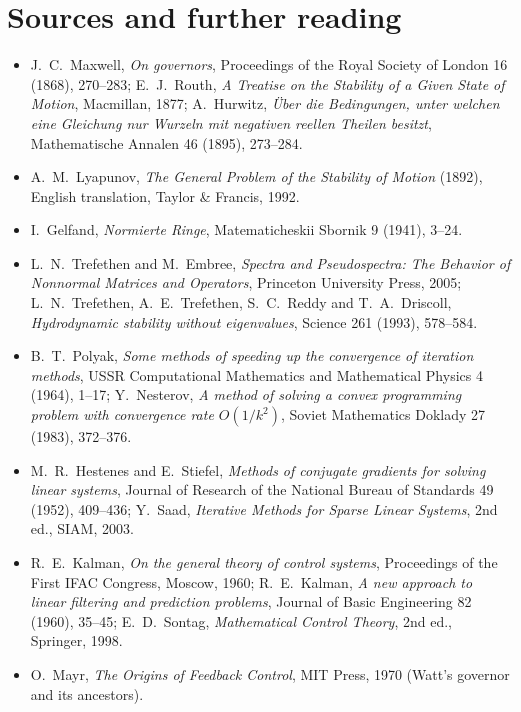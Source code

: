 \section*{Sources and further reading}

\begin{itemize}
\item J.~C.~Maxwell, \emph{On governors}, Proceedings of the Royal Society of London 16 (1868), 270--283; E.~J.~Routh, \emph{A Treatise on
the Stability of a Given State of Motion}, Macmillan, 1877; A.~Hurwitz, \emph{\"Uber die Bedingungen, unter welchen eine Gleichung nur
Wurzeln mit negativen reellen Theilen besitzt}, Mathematische Annalen 46 (1895), 273--284.
\item A.~M.~Lyapunov, \emph{The General Problem of the Stability of Motion} (1892), English translation, Taylor \& Francis, 1992.
\item I.~Gelfand, \emph{Normierte Ringe}, Matematicheskii Sbornik 9 (1941), 3--24.
\item L.~N.~Trefethen and M.~Embree, \emph{Spectra and Pseudospectra: The Behavior of Nonnormal Matrices and Operators}, Princeton
University Press, 2005; L.~N.~Trefethen, A.~E.~Trefethen, S.~C.~Reddy and T.~A.~Driscoll, \emph{Hydrodynamic stability without
eigenvalues}, Science 261 (1993), 578--584.
\item B.~T.~Polyak, \emph{Some methods of speeding up the convergence of iteration methods}, USSR Computational Mathematics and
Mathematical Physics 4 (1964), 1--17; Y.~Nesterov, \emph{A method of solving a convex programming problem with convergence rate
$O(1/k^2)$}, Soviet Mathematics Doklady 27 (1983), 372--376.
\item M.~R.~Hestenes and E.~Stiefel, \emph{Methods of conjugate gradients for solving linear systems}, Journal of Research of the National
Bureau of Standards 49 (1952), 409--436; Y.~Saad, \emph{Iterative Methods for Sparse Linear Systems}, 2nd ed., SIAM, 2003.
\item R.~E.~Kalman, \emph{On the general theory of control systems}, Proceedings of the First IFAC Congress, Moscow, 1960; R.~E.~Kalman,
\emph{A new approach to linear filtering and prediction problems}, Journal of Basic Engineering 82 (1960), 35--45; E.~D.~Sontag,
\emph{Mathematical Control Theory}, 2nd ed., Springer, 1998.
\item O.~Mayr, \emph{The Origins of Feedback Control}, MIT Press, 1970 (Watt's governor and its ancestors).
\end{itemize}
